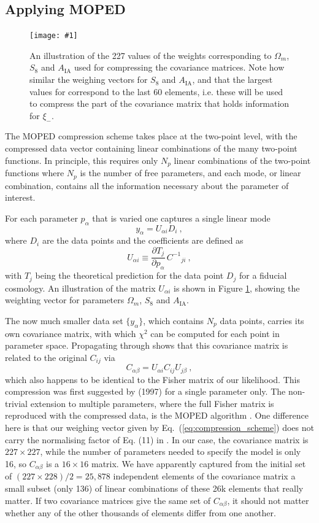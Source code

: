 \documentclass[twocolumn,nofootinbib]{\docclass}
\newcommand{\sfig}[2]{
	\texttt{[image: \#1]}
}
\newcommand{\Svwide}[2]{
	\begin{figure}[thbp]
		\sfig{../figures/#1.pdf}{\textwidth}
		\caption{{\small #2}}
		\label{fig:#1}
	\end{figure}
}
\newcommand{\rf}[1]{Figure \ref{fig:#1}}
\newcommand{\ec}[1]{Eq.~(\ref{eq:#1})}
\newcommand\be{\begin{equation}}
\newcommand\ee{\end{equation}}
\begin{document}
	\subsection{Applying MOPED}
	\label{subsec:2pt_compression}
	
	\Svwide{Weights_2pt}{An illustration of the 227 values of the weights corresponding to $\Omega_m$, $S_8$ and $A_{\mathrm{IA}}$ used for compressing the covariance matrices. Note how similar the weighing vectors for $S_8$ and $A_{\mathrm{IA}}$, and that the largest values for correspond to the last 60 elements, i.e. these will be used to compress the part of the covariance matrix that holds information for $\xi_-$.}
	
	The MOPED compression scheme takes place at the two-point level, with the compressed data vector containing linear combinations of the many two-point functions. In principle, this requires only $N_p$ linear combinations of the two-point functions where $N_p$ is the number of free parameters, and each mode, or linear combination, contains all the information necessary about the parameter of interest. 
	
	For each parameter $p_\alpha$ that is varied one captures a single linear mode
	\be
	y_\alpha = U_{\alpha i} D_i\
	,\ee
	where $D_i$ are the data points and the coefficients are defined as
	\be \label{eq:compression_scheme}
	U_{\alpha i} \equiv \frac{\partial T_j}{\partial p_\alpha} \, C^{-1}{}_{ji}\
	,\ee
	with $T_j$ being the theoretical prediction for the data point $D_j$ for a fiducial cosmology. An illustration of the matrix $U_{\alpha i}$ is shown in \rf{Weights_2pt}, showing the weighting vector for parameters $\Omega_m$, $S_8$ and $A_{\mathrm{IA}}$.
	
	The now much smaller data set $\{y_\alpha\}$, which contains $N_p$ data points, carries its own covariance matrix, with which $\chi^2$ can be computed for each point in parameter space. Propagating through shows that this covariance matrix is related to the original $C_{ij}$ via
	\be
	C_{\alpha\beta} = U_{\alpha i} C_{ij} U_{j\beta}\ 
	,\ee
	which also happens to be identical to the Fisher matrix of our likelihood. This compression was first suggested by \citeauthor{Tegmark:1997maa} (1997) for a single parameter only.  The non-trivial extension to multiple parameters, where the full Fisher matrix is reproduced with the compressed data, is the MOPED algorithm \citep{Heavens:2000hjl}. One difference here is that our weighing vector given by \ec{compression_scheme} does not carry the normalising factor of Eq. (11) in \citep{Heavens:2000hjl}. In our case, the covariance matrix is  $227 \times 227$, while the number of parameters needed to specify the model is only 16, so $C_{\alpha\beta}$ is a $16\times 16$ matrix. We have apparently captured from the initial set of $(227 \times 228)/2 = 25,878$ independent elements of the covariance matrix a small subset (only 136) of linear combinations of these 26k elements that really matter. If two covariance matrices give the same set of $C_{\alpha\beta}$, it should not matter whether any of the other thousands of elements differ from one another.
	
\end{document}
